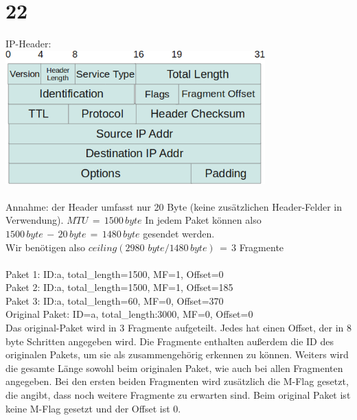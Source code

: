 \documentclass[12pt, a4paper]{article}
\begin{document}
	\section{22}
	IP-Header:\\
	\includegraphics[width=10cm]{22.png}\\
	\\Annahme: der Header umfasst nur 20 Byte (keine zusätzlichen Header-Felder in Verwendung).
	$MTU\,=\,1500\,byte$
	In jedem Paket können also \\
	$1500\,byte\,-\,20\,byte\,=\,1480\,byte$ gesendet werden.\\
	Wir benötigen also $ceiling(2980\,\,byte/1480\,byte)\,=\,3$ Fragmente \\
	\\Paket 1: ID:a, total\_length=1500, MF=1, Offset=0 \\
	Paket 2: ID:a, total\_length=1500, MF=1, Offset=185 \\
	Paket 3: ID:a, total\_length=60,   MF=0, Offset=370 \\
	Original Paket: ID=a, total\_length:3000, MF=0, Offset=0\\
	
	Das original-Paket wird in 3 Fragmente aufgeteilt. Jedes hat einen Offset, der in 8 byte Schritten angegeben wird. Die Fragmente enthalten außerdem die ID des originalen Pakets, um sie als zusammengehörig erkennen zu können. Weiters wird die gesamte Länge sowohl beim originalen Paket, wie auch bei allen Fragmenten angegeben. Bei den ersten beiden Fragmenten wird zusätzlich die M-Flag gesetzt, die angibt, dass noch weitere Fragmente zu erwarten sind. Beim original Paket ist keine M-Flag gesetzt und der Offset ist 0.
		
	
\end{document}
